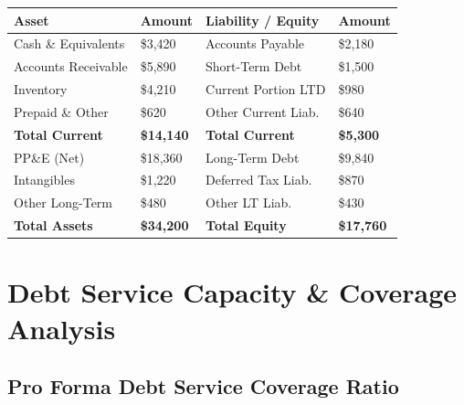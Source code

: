 \documentclass[11pt,a4paper]{article}
\begin{document}
\renewcommand{\arraystretch}{1.35}
\begin{tabularx}{\textwidth}{@{} L{4.5cm} R{2.5cm} | L{4.5cm} R{2.5cm} @{}}
  \toprule
  {\color{white}\bfseries\small Asset} &
  {\color{white}\bfseries\small Amount} &
  {\color{white}\bfseries\small Liability / Equity} &
  {\color{white}\bfseries\small Amount} \\
  \midrule
  Cash \& Equivalents        & \$3,420   & Accounts Payable         & \$2,180   \\
  Accounts Receivable        & \$5,890   & Short-Term Debt          & \$1,500   \\
  Inventory                  & \$4,210   & Current Portion LTD      & \$980     \\
  Prepaid \& Other           & \$620     & Other Current Liab.      & \$640     \\
  \textbf{Total Current}     & \textbf{\$14,140} & \textbf{Total Current} & \textbf{\$5,300} \\
  PP\&E (Net)                & \$18,360  & Long-Term Debt           & \$9,840   \\
  Intangibles                & \$1,220   & Deferred Tax Liab.       & \$870     \\
  Other Long-Term            & \$480     & Other LT Liab.           & \$430     \\
  \textbf{Total Assets}      & \textbf{\$34,200} & \textbf{Total Equity}   & \textbf{\$17,760} \\
  \bottomrule
\end{tabularx}

\vspace{6mm}

\section{Debt Service Capacity \& Coverage Analysis}

\subsection{Pro Forma Debt Service Coverage Ratio}
\end{document}

